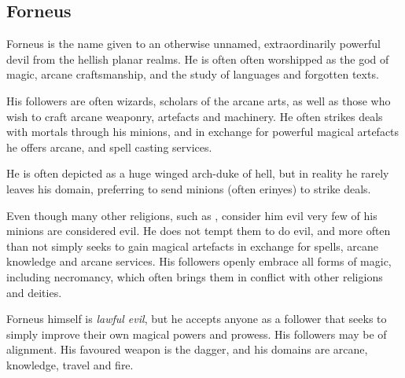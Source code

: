 \subsection{Forneus}
\label{sec:Forneus}

Forneus is the name given to an otherwise unnamed, extraordinarily powerful
devil from the hellish planar realms. He is often often worshipped as the god
of magic, arcane craftsmanship, and the study of languages and forgotten texts.

His followers are often wizards, scholars of the arcane arts, as well as those
who wish to craft arcane weaponry, artefacts and machinery. He often strikes
deals with mortals through his minions, and in exchange for powerful magical
artefacts he offers arcane, and spell casting services.

He is often depicted as a huge winged arch-duke of hell, but in reality he
rarely leaves his domain, preferring to send minions (often erinyes) to
strike deals.

Even though many other religions, such as , consider him evil
very few of his minions are considered evil. He does not tempt them to do
evil, and more often than not simply seeks to gain magical artefacts in
exchange for spells, arcane knowledge and arcane services. His followers openly
embrace all forms of magic, including necromancy, which often brings them in
conflict with other religions and deities.

\begin{35e}{}
  Forneus himself is \emph{lawful evil}, but he accepts anyone as a follower
  that seeks to simply improve their own magical powers and prowess. His
  followers may be of alignment. His favoured weapon is the dagger, and his
  domains are arcane, knowledge, travel and fire.
\end{35e}
